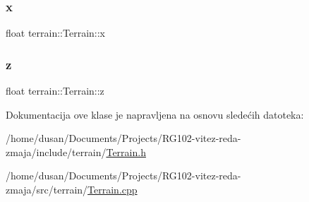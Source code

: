 \subsubsection{\texorpdfstring{x}{x}}
{\footnotesize\ttfamily float terrain\+::\+Terrain\+::x\hspace{0.3cm}{\ttfamily [private]}}

\mbox{\label{classterrain_1_1Terrain_aaa4c36ce01096f81a0ee174c36f19657}} 
\subsubsection{\texorpdfstring{z}{z}}
{\footnotesize\ttfamily float terrain\+::\+Terrain\+::z\hspace{0.3cm}{\ttfamily [private]}}



Dokumentacija ove klase je napravljena na osnovu sledećih datoteka\+:\begin{DoxyCompactItemize}
\item 
/home/dusan/\+Documents/\+Projects/\+R\+G102-\/vitez-\/reda-\/zmaja/include/terrain/\hyperlink{Terrain_8h}{Terrain.\+h}\item 
/home/dusan/\+Documents/\+Projects/\+R\+G102-\/vitez-\/reda-\/zmaja/src/terrain/\hyperlink{Terrain_8cpp}{Terrain.\+cpp}\end{DoxyCompactItemize}
